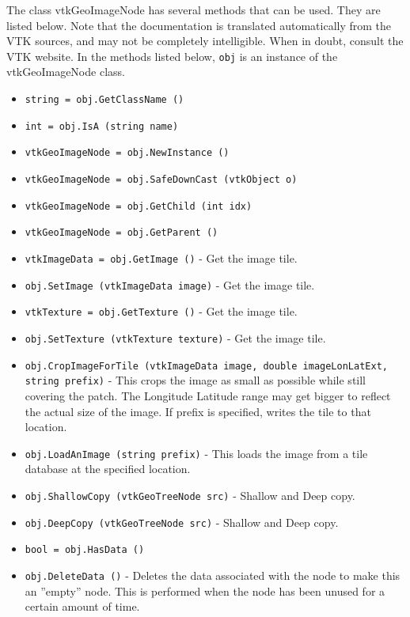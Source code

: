 The class vtkGeoImageNode has several methods that can be used.
  They are listed below.
Note that the documentation is translated automatically from the VTK sources,
and may not be completely intelligible.  When in doubt, consult the VTK website.
In the methods listed below, \verb|obj| is an instance of the vtkGeoImageNode class.
\begin{itemize}
\item  \verb|string = obj.GetClassName ()|

\item  \verb|int = obj.IsA (string name)|

\item  \verb|vtkGeoImageNode = obj.NewInstance ()|

\item  \verb|vtkGeoImageNode = obj.SafeDownCast (vtkObject o)|

\item  \verb|vtkGeoImageNode = obj.GetChild (int idx)|

\item  \verb|vtkGeoImageNode = obj.GetParent ()|

\item  \verb|vtkImageData = obj.GetImage ()| -  Get the image tile.

\item  \verb|obj.SetImage (vtkImageData image)| -  Get the image tile.

\item  \verb|vtkTexture = obj.GetTexture ()| -  Get the image tile.

\item  \verb|obj.SetTexture (vtkTexture texture)| -  Get the image tile.

\item  \verb|obj.CropImageForTile (vtkImageData image, double imageLonLatExt, string prefix)| -  This crops the image as small as possible while still covering the 
 patch.  The Longitude Latitude range may get bigger to reflect the
 actual size of the image.
 If prefix is specified, writes the tile to that location.

\item  \verb|obj.LoadAnImage (string prefix)| -  This loads the image from a tile database at the specified location.

\item  \verb|obj.ShallowCopy (vtkGeoTreeNode src)| -  Shallow and Deep copy.

\item  \verb|obj.DeepCopy (vtkGeoTreeNode src)| -  Shallow and Deep copy.

\item  \verb|bool = obj.HasData ()|

\item  \verb|obj.DeleteData ()| -  Deletes the data associated with the node to make this
 an ''empty'' node. This is performed when the node has
 been unused for a certain amount of time.

\end{itemize}
